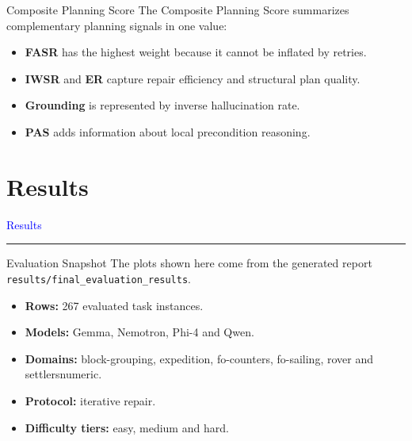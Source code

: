 \documentclass{beamer}
\begin{document}
\begin{frame}{Composite Planning Score}\footnotesize
    The Composite Planning Score summarizes complementary planning signals in one value:

    \vspace{0.2cm}

    \vspace{0.35cm}
    \begin{itemize}
        \item \textbf{FASR} has the highest weight because it cannot be inflated by retries.
        \item \textbf{IWSR} and \textbf{ER} capture repair efficiency and structural plan quality.
        \item \textbf{Grounding} is represented by inverse hallucination rate.
        \item \textbf{PAS} adds information about local precondition reasoning.
    \end{itemize}
\end{frame}

\section{Results}
\begin{frame}[c]
    \centering
    
    {\Huge\textcolor{blue}{Results}}
    
    \vspace{0.1cm}
    
    \textcolor{black}{\rule{10cm}{1pt}}
    
\end{frame}

\begin{frame}{Evaluation Snapshot}\footnotesize
    The plots shown here come from the generated report \texttt{results/final\_evaluation\_results}.

    \vspace{0.25cm}
    \begin{itemize}
        \item \textbf{Rows:} 267 evaluated task instances.
        \item \textbf{Models:} Gemma, Nemotron, Phi-4 and Qwen.
        \item \textbf{Domains:} block-grouping, expedition, fo-counters, fo-sailing, rover and settlersnumeric.
        \item \textbf{Protocol:} iterative repair.
        \item \textbf{Difficulty tiers:} easy, medium and hard.
    \end{itemize}
\end{frame}
\end{document}
